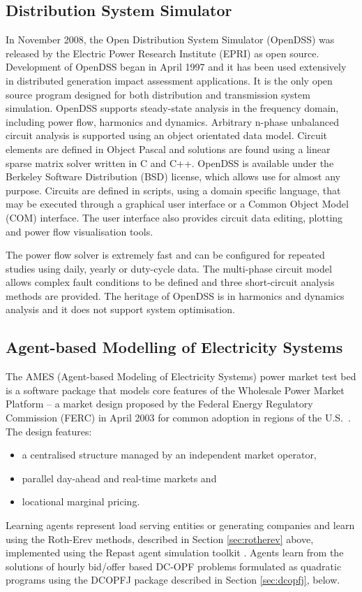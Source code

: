 \subsection{Distribution System Simulator}
In November 2008, the Open Distribution System Simulator (OpenDSS) was released
by the Electric Power Research Institute (EPRI) as open source.  Development of
OpenDSS began in April 1997 and it has been used extensively in distributed
generation impact assessment applications.  It is the only open source
program designed for both distribution and transmission system simulation.
OpenDSS supports steady-state analysis in the frequency domain, including power
flow, harmonics and dynamics.  Arbitrary n-phase unbalanced circuit analysis is supported using an object orientated data model.  Circuit elements are defined in Object Pascal
and solutions are found using a linear sparse matrix solver written in C and
C++.  OpenDSS is available under the Berkeley Software Distribution (BSD)
license, which allows use for almost any purpose.  Circuits are defined in
scripts, using a domain specific language, that may be executed through a
graphical user interface or a Common Object Model (COM) interface.  The user
interface also provides circuit data editing, plotting and power flow
visualisation tools.

The power flow solver is extremely fast and can be configured for repeated
studies using daily, yearly or duty-cycle data.  The multi-phase circuit model allows
complex fault conditions to be defined and three short-circuit analysis methods
are provided.  The heritage of OpenDSS is in harmonics and dynamics analysis
and it does not support system optimisation.

\subsection{Agent-based Modelling of Electricity Systems}
\label{sec:ames}
The AMES (Agent-based Modeling of Electricity Systems) power market test bed is
a software package that models core features of the Wholesale Power Market
Platform -- a market design proposed by the Federal Energy Regulatory
Commission (FERC) in April 2003 for common adoption in regions of the
U.S.~\cite{tesfatsi:wpmp}. The design features:
\begin{itemize}
  \item a centralised structure managed by an independent market operator,
  \item parallel day-ahead and real-time markets and
  \item locational marginal pricing.
\end{itemize}
Learning agents represent load serving entities or generating companies and
learn using the Roth-Erev methods, described in Section \ref{sec:rotherev}
above, implemented using the Repast agent simulation toolkit
\cite{gieseler:thesis}.
Agents learn from the solutions of hourly bid/offer based
DC-OPF problems formulated as quadratic programs using the DCOPFJ package
\cite{tesfatsi:dcopf} described in Section \ref{sec:dcopfj}, below.

